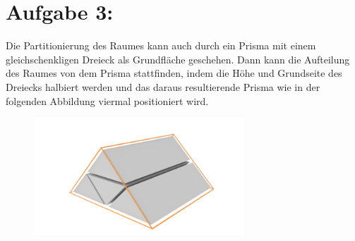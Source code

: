 \section*{Aufgabe 3: }
Die Partitionierung des Raumes kann auch durch ein Prisma mit einem gleichschenkligen Dreieck als Grundfläche geschehen. Dann kann die Aufteilung des Raumes von dem Prisma stattfinden, indem die Höhe und Grundseite des Dreiecks halbiert werden und das daraus resultierende Prisma wie in der folgenden Abbildung viermal positioniert wird.
\begin{figure}[H]
  \includegraphics[width=0.7\textwidth]{prism}
\end{figure}